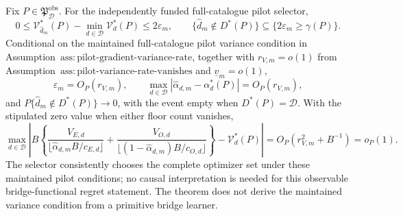 Fix \(P\in\mathfrak P_{\mathcal D}^{\mathrm{obs}}\). For the independently funded full-catalogue pilot selector,
\[
0\le\mathcal V_{\widehat d_m}^*(P)-\min_{d\in\mathcal D}\mathcal V_d^*(P)\le2\varepsilon_m,
\qquad
\{\widehat d_m\notin D^*(P)\}\subseteq\{2\varepsilon_m\ge\gamma(P)\}.
\]
Conditional on the maintained full-catalogue pilot variance condition in Assumption~\(\mathrm{ass{:}pilot\text{-}gradient\text{-}variance\text{-}rate}\), together with \(r_{V,m}=o(1)\) from Assumption~\(\mathrm{ass{:}pilot\text{-}variance\text{-}rate\text{-}vanishes}\) and \(\underline v_m=o(1)\),
\[
\varepsilon_m=O_P(r_{V,m}),
\qquad
\max_{d\in\mathcal D}|\widehat\alpha_{d,m}-\alpha_d^*(P)|=O_P(r_{V,m}),
\]
and \(P\{\widehat d_m\notin D^*(P)\}\to0\), with the event empty when \(D^*(P)=\mathcal D\). With the stipulated zero value when either floor count vanishes,
\[
\max_{d\in\mathcal D}\left|B\left\{
\frac{V_{E,d}}{\lfloor\widehat\alpha_{d,m}B/c_{E,d}\rfloor}
+\frac{V_{O,d}}{\lfloor(1-\widehat\alpha_{d,m})B/c_{O,d}\rfloor}
\right\}-\mathcal V_d^*(P)\right|
=O_P(r_{V,m}^2+B^{-1})=o_P(1).
\]
The selector consistently chooses the complete optimizer set under these maintained pilot conditions; no causal interpretation is needed for this observable bridge-functional regret statement. The theorem does not derive the maintained variance condition from a primitive bridge learner.